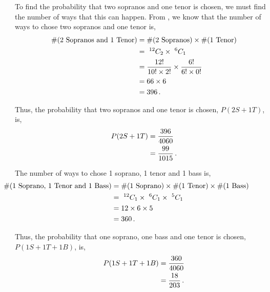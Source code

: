 \begin{subquestions}
\begin{subsubquestions}
\begin{subsubsubquestions}
To find the probability that two sopranos and one tenor is chosen, we must find the number of ways that this can happen. From , we know that the number of ways to chose two sopranos and one tenor is,
\begin{align}
	\#(\text{2 Sopranos and 1 Tenor}) & = \#(\text{2 Sopranos}) \times \#(\text{1 Tenor}) \nonumber \\
	                              & = ~ ^{12}C_2 \times  ~^{6}C_1 \nonumber \\
	                              & = \frac{12!}{10! \times 2!} \times \frac{6!}{6! \times 0!} \nonumber \\
	                              & = 66 \times 6 \nonumber \\
	                              & = 396 \,.
\end{align}

Thus, the probability that two sopranos and one tenor is chosen, $P(2S + 1T)$, is,
\begin{align}
	P(2S + 1T) & = \frac{396}{4060} \nonumber \\
	           & = \frac{99}{1015} \,.
\end{align}


\subsubsubquestion

The number of ways to chose 1 soprano, 1 tenor and 1 bass is,
\begin{align}
	\hspace{-50pt}
	\#(\text{1 Soprano, 1 Tenor and 1 Bass}) & =  \#(\text{1 Soprano}) \times \#(\text{1 Tenor}) \times \#(\text{1 Bass}) \nn \\
	                                     & = ~^{12}C_1 \times ~^{6}C_1 \times ~^{5}C_1 \nn \\
	                                     & = 12 \times 6 \times 5 \nn \\
	                                     & = 360 \,.
\end{align}

Thus, the probability that one soprano, one bass and one tenor is chosen, $P(1S+1T+1B)$, is,
\begin{align}
	P(1S + 1T + 1B) & = \frac{360}{4060} \nonumber \\
			        & = \frac{18}{203} \,.
\end{align}



\end{subsubsubquestions}
\end{subsubquestions}
\end{subquestions}

